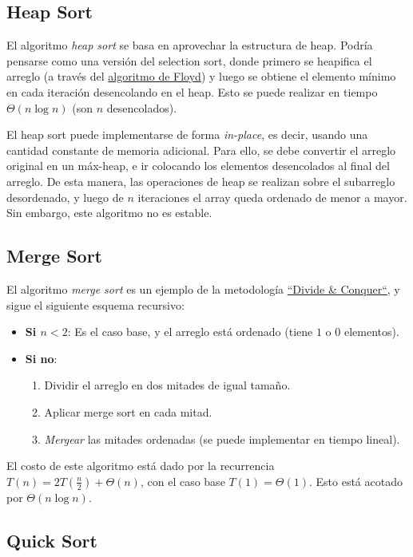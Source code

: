 \documentclass{article}
\newcommand{\BigTheta}[1]{{\Theta(#1)}}
\begin{document}
\subsection{Heap Sort}

El algoritmo \textit{heap sort} se basa en aprovechar la estructura de heap. Podría pensarse como una versión del selection sort, donde primero se heapifica el arreglo (a través del \hyperref[subsubsec-floyd]{algoritmo de Floyd}) y luego se obtiene el elemento mínimo en cada iteración desencolando en el heap. Esto se puede realizar en tiempo $\BigTheta{n\log{n}}$ (son $n$ desencolados).

El heap sort puede implementarse de forma \textit{in-place}, es decir, usando una cantidad constante de memoria adicional. Para ello, se debe convertir el arreglo original en un máx-heap, e ir colocando los elementos desencolados al final del arreglo. De esta manera, las operaciones de heap se realizan sobre el subarreglo desordenado, y luego de $n$ iteraciones el array queda ordenado de menor a mayor. Sin embargo, este algoritmo no es estable.

\subsection{Merge Sort}

El algoritmo \textit{merge sort} es un ejemplo de la metodología \hyperref[sec-dyc]{``Divide \& Conquer``}, y sigue el siguiente esquema recursivo:
\begin{itemize}
    \item \textbf{Si $n < 2$}: Es el caso base, y el arreglo está ordenado (tiene $1$ o $0$ elementos).
    \item \textbf{Si no}:
          \begin{enumerate}
              \item Dividir el arreglo en dos mitades de igual tamaño.
              \item Aplicar merge sort en cada mitad.
              \item \textit{Mergear} las mitades ordenadas (se puede implementar en tiempo lineal).
          \end{enumerate}
\end{itemize}

El costo de este algoritmo está dado por la recurrencia $T(n) = 2 T(\frac{n}{2}) + \BigTheta{n}$, con el caso base $T(1) = \BigTheta{1}$. Esto está acotado por $\BigTheta{n\log{n}}$.

\subsection{Quick Sort}
\end{document}
